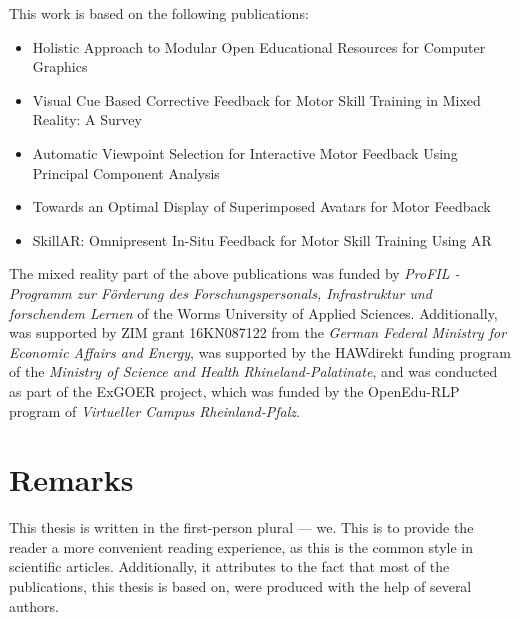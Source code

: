 This work is based on the following publications:
\begin{itemize}
	\setlength{\itemsep}{-0.3cm}
	\item Holistic Approach to Modular Open Educational Resources for Computer Graphics \cite{diller2024holistic}
	\item Visual Cue Based Corrective Feedback for Motor Skill Training in Mixed Reality: A Survey \cite{diller2022vcb}
	\item Automatic Viewpoint Selection for Interactive Motor Feedback Using Principal Component Analysis \cite{diller2024automatic}
	\item Towards an Optimal Display of Superimposed Avatars for Motor Feedback \cite{diller2025towards}
	\item SkillAR: Omnipresent In-Situ Feedback for Motor Skill Training Using AR \cite{diller2025skillar}
\end{itemize}


The mixed reality part of the above publications was funded by \emph{ProFIL - Programm zur Förderung des Forschungspersonals, Infrastruktur und forschendem Lernen} of the Worms University of Applied Sciences. Additionally, \cite{diller2024automatic} was supported by ZIM grant 16KN087122 from the \emph{German Federal Ministry for Economic Affairs and Energy}, \cite{diller2025skillar} was supported by the HAWdirekt funding program of the \emph{Ministry of Science and Health Rhineland-Palatinate}, and \cite{diller2024holistic} was conducted as part of the ExGOER project, which was funded by the OpenEdu-RLP program of \emph{Virtueller Campus Rheinland-Pfalz}.

\section{Remarks}

This thesis is written in the first-person plural --- we. This is to provide the reader a more convenient reading experience, as this is the common style in scientific articles. Additionally, it attributes to the fact that most of the publications, this thesis is based on, were produced with the help of several authors.
